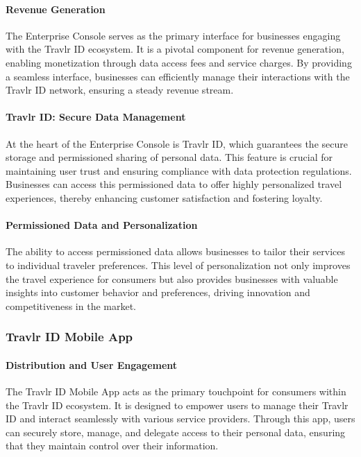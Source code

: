 \documentclass{article}
\begin{document}
\paragraph{Revenue Generation}

The Enterprise Console serves as the primary interface for businesses engaging with the Travlr ID ecosystem. It is a pivotal component for revenue generation, enabling monetization through data access fees and service charges. By providing a seamless interface, businesses can efficiently manage their interactions with the Travlr ID network, ensuring a steady revenue stream.

\paragraph{Travlr ID: Secure Data Management}

At the heart of the Enterprise Console is Travlr ID, which guarantees the secure storage and permissioned sharing of personal data. This feature is crucial for maintaining user trust and ensuring compliance with data protection regulations. Businesses can access this permissioned data to offer highly personalized travel experiences, thereby enhancing customer satisfaction and fostering loyalty.

\paragraph{Permissioned Data and Personalization}

The ability to access permissioned data allows businesses to tailor their services to individual traveler preferences. This level of personalization not only improves the travel experience for consumers but also provides businesses with valuable insights into customer behavior and preferences, driving innovation and competitiveness in the market.

\subsubsection{Travlr ID Mobile App}

\paragraph{Distribution and User Engagement}

The Travlr ID Mobile App acts as the primary touchpoint for consumers within the Travlr ID ecosystem. It is designed to empower users to manage their Travlr ID and interact seamlessly with various service providers. Through this app, users can securely store, manage, and delegate access to their personal data, ensuring that they maintain control over their information.
\end{document}
